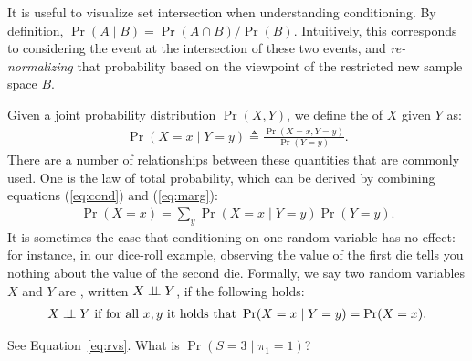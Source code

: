 \documentclass{tufte-handout}
\begin{document}
\begin{marginfigure}
    \caption{It is useful to visualize set intersection when understanding conditioning. 
    By definition, $\Pr(A \mid B) = \Pr(A \cap B)/\Pr(B)$. Intuitively, this corresponds to 
    considering the event at the intersection of these two events, and \emph{re-normalizing}
    that probability based on the viewpoint of the restricted new sample space $B$.
    }
\end{marginfigure}
Given a joint probability distribution $\Pr(X, Y)$, we define the 
of $X$ given $Y$ as:
\begin{align}
    \Pr(X=x \mid Y = y) \triangleq \frac{\Pr(X = x, Y = y)}{\Pr(Y = y)}.
    \label{eq:cond}
\end{align}
There are a number of relationships between these quantities that are commonly used.
One is the law of total probability, which can be derived by
combining equations (\ref{eq:cond}) and (\ref{eq:marg}):
\begin{align}
    \Pr(X=x) = \sum_y \Pr(X = x \mid Y = y)\Pr(Y=y).
\end{align}
It is sometimes the case that conditioning on one random variable has no effect:
for instance, in our dice-roll example, observing the value of the first die
tells you nothing about the value of the second die. Formally, we say two 
random variables $X$ and $Y$ are , written $X \perp \!\!\! \perp Y$, if 
the following holds:
\begin{align*}
    X \perp \!\!\! \perp Y \text{ if for all }x, y \text{ it holds that } \Pr(X=x \mid Y=y) = \Pr(X = x).
\end{align*}


\begin{exercise}[$\star$]
    See Equation~\ref{eq:rvs}.  What is $\Pr(S = 3 \mid \pi_1 = 1)$?
\end{exercise}
\end{document}
